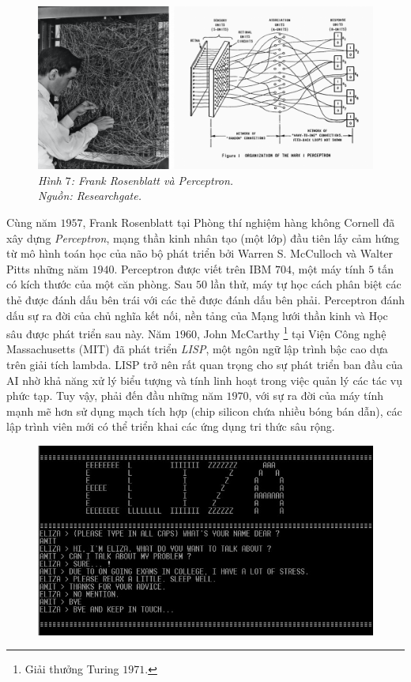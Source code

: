 \begin{multicols}{2}
	\begin{figure}[H]
		\vspace*{-5pt}
		\centering
		\captionsetup{labelformat= empty, justification=centering}
		\includegraphics[width= 1\linewidth]{perceptron_1.png}
		\caption{\small\textit{\color{cackithi}Hình $7$: Frank Rosenblatt và Perceptron.\\ Nguồn: Researchgate.}}
		\vspace*{-10pt}
	\end{figure}
	Cùng năm $1957$, Frank Rosenblatt tại Phòng thí nghiệm hàng không Cornell đã xây dựng \textit{Perceptron}, mạng thần kinh nhân tạo (một lớp) đầu tiên lấy cảm hứng từ mô hình toán học của não bộ phát triển bởi Warren S. McCulloch và Walter Pitts những năm $1940$. Perceptron được viết trên IBM $704$, một máy tính $5$ tấn có kích thước của một căn phòng. Sau $50$ lần thử, máy tự học cách phân biệt các thẻ được đánh dấu bên trái với các thẻ được đánh dấu bên phải. Perceptron đánh dấu sự ra đời của chủ nghĩa kết nối, nền tảng của Mạng lưới thần kinh  và Học sâu được phát triển sau này.
	\vskip 0.1cm
	Năm $1960$, John McCarthy \footnote{\color{cackithi}Giải thưởng Turing $1971$.} tại Viện Công nghệ Massachusetts (MIT) đã phát triển \textit{LISP}, một ngôn ngữ lập trình bậc cao dựa trên giải tích lambda. LISP trở nên rất quan trọng cho sự phát triển ban đầu của AI nhờ khả năng xử lý biểu tượng và tính linh hoạt trong việc quản lý các tác vụ phức tạp. Tuy vậy, phải đến đầu những năm $1970$, với sự ra đời của máy tính mạnh mẽ hơn sử dụng mạch tích hợp (chip silicon chứa nhiều bóng bán dẫn), các lập trình viên mới có thể triển khai các ứng dụng tri thức sâu rộng.
	\begin{figure}[H]
		\vspace*{-5pt}
		\centering
		\captionsetup{labelformat= empty, justification=centering}
		\includegraphics[width= 1\linewidth]{eliza.jpeg}

\end{figure}
\end{multicols}
